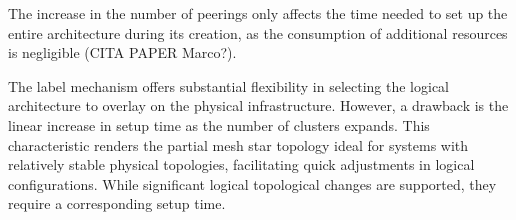 The increase in the number of peerings only affects the time needed to set up the entire architecture during its creation, as the consumption of additional resources is negligible (CITA PAPER Marco?).

The label mechanism offers substantial flexibility in selecting the logical architecture to overlay on the physical infrastructure. However, a drawback is the linear increase in setup time as the number of clusters expands. This characteristic renders the partial mesh star topology ideal for systems with relatively stable physical topologies, facilitating quick adjustments in logical configurations. While significant logical topological changes are supported, they require a corresponding setup time.
